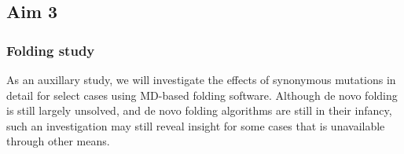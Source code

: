 \documentclass[11pt]{nih}
\begin{document}
\subsection{Aim 3}

\subsubsection{Folding study}
As an auxillary study, we will investigate the effects of synonymous mutations in detail for select cases using MD-based folding software. Although de novo folding is still largely unsolved, and de novo folding algorithms are still in their infancy, such an investigation may still reveal insight for some cases that is unavailable through other means. \cite{Zhang:2008p3335}  




 

\appendix
\end{document}
